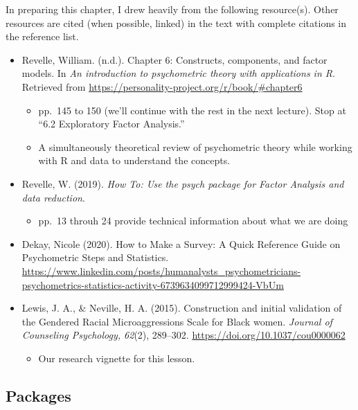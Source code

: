 \documentclass[
  english,
]{book}
\providecommand{\tightlist}{%
  \setlength{\itemsep}{0pt}\setlength{\parskip}{0pt}}
\begin{document}
In preparing this chapter, I drew heavily from the following resource(s). Other resources are cited (when possible, linked) in the text with complete citations in the reference list.

\begin{itemize}
\tightlist
\item
  Revelle, William. (n.d.). Chapter 6: Constructs, components, and factor models. In \emph{An introduction to psychometric theory with applications in R}. Retrieved from \url{https://personality-project.org/r/book/\#chapter6}

  \begin{itemize}
  \tightlist
  \item
    pp.~145 to 150 (we'll continue with the rest in the next lecture). Stop at ``6.2 Exploratory Factor Analysis.''
  \item
    A simultaneously theoretical review of psychometric theory while working with R and data to understand the concepts.
  \end{itemize}
\item
  Revelle, W. (2019). \emph{How To: Use the psych package for Factor Analysis and data reduction}.

  \begin{itemize}
  \tightlist
  \item
    pp.~13 throuh 24 provide technical information about what we are doing
  \end{itemize}
\item
  Dekay, Nicole (2020). How to Make a Survey: A Quick Reference Guide on Psychometric Steps and Statistics. \url{https://www.linkedin.com/posts/humanalysts_psychometricians-psychometrics-statistics-activity-6739634099712999424-VbUm}
\item
  Lewis, J. A., \& Neville, H. A. (2015). Construction and initial validation of the Gendered Racial Microaggressions Scale for Black women. \emph{Journal of Counseling Psychology, 62}(2), 289--302. \url{https://doi.org/10.1037/cou0000062}

  \begin{itemize}
  \tightlist
  \item
    Our research vignette for this lesson.
  \end{itemize}
\end{itemize}

\hypertarget{packages-6}{%
\subsection{Packages}\label{packages-6}}
\end{document}
